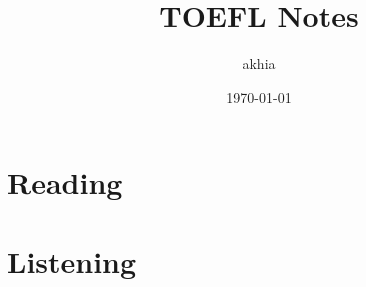 \documentclass{report}
\title{TOEFL Notes}
\author{akhia}
\date{\today}
\begin{document}
\chapter{Reading}










































































\chapter{Listening}






\end{document}
